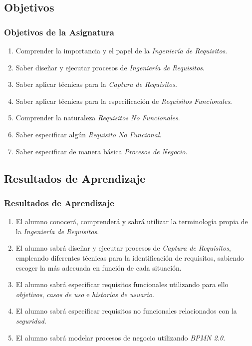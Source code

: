 \documentclass[a4paper,slidestop,xcolor=pst,dvips,blue]{beamer}
\begin{document}
\subsection{Objetivos}

\begin{frame}[c]
	\frametitle{Objetivos de la Asignatura}
    \begin{enumerate}[<+->]
		\item Comprender la importancia y el papel de la \emph{Ingeniería de Requisitos}.
        \item Saber diseñar y ejecutar procesos de \emph{Ingeniería de Requisitos}.
		\item Saber aplicar técnicas para la \emph{Captura de Requisitos}.
		\item Saber aplicar técnicas para la especificación de \emph{Requisitos Funcionales}.
		\item Comprender la naturaleza \emph{Requisitos No Funcionales}.
		\item Saber especificar algún \emph{Requisito No Funcional}.
		\item Saber especificar de manera básica \emph{Procesos de Negocio}.
	 \end{enumerate}
\end{frame}

\subsection{Resultados de Aprendizaje}

\begin{frame}[c]
	\frametitle{Resultados de Aprendizaje}
    	\begin{enumerate}[<+->]
			\item El alumno conocerá, comprenderá y sabrá utilizar la terminología propia de la \emph{Ingeniería de Requisitos}.
            \item El alumno sabrá diseñar y ejecutar procesos de \emph{Captura de Requisitos}, empleando diferentes técnicas para la identificación de requisitos, sabiendo escoger la más adecuada en función de cada situación.
            \item El alumno sabrá especificar requisitos funcionales utilizando para ello \emph{objetivos}, \emph{casos de uso} e \emph{historias de usuario}.
            \item El alumno sabrá especificar requisitos no funcionales relacionados con la \emph{seguridad}.
            \item El alumno sabrá modelar procesos de negocio utilizando \emph{BPMN 2.0}.
		\end{enumerate}
\end{frame}
\end{document}
